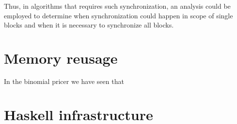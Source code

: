 Thus, in algorithms that requires such synchronization, an analysis
could be employed to determine when synchronization could happen in
scope of single blocks and when it is necessary to synchronize all
blocks.

\section{Memory reusage}
In the binomial pricer we have seen that

\section{Haskell infrastructure}
\label{sec:haskell_infrastructure}

